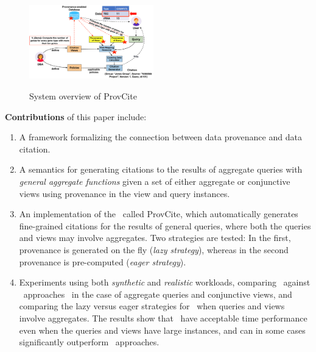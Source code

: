 \begin{figure}[t!]
    \centering
    \includegraphics[width=0.48\textwidth,height=0.25\textwidth]{Figures/general_citaiton_framework.pdf}
    \caption{System overview of ProvCite}
    \small \label{fig:DataCitationFW}
\end{figure}

{\textbf{Contributions}} of this paper include:

\begin{enumerate}
\item A framework formalizing the connection between data provenance and data citation.
\item %
A semantics for generating citations to the results of aggregate queries with {\em general aggregate functions} given a set of either aggregate or conjunctive views using provenance in the view and query instances.
\item An implementation of the \pba\ called ProvCite, which  automatically generates fine-grained citations for the results of general queries, where both the queries and views may involve aggregates. Two strategies are tested: In the first, provenance is generated on the fly ({\em lazy strategy}), whereas in the second provenance is pre-computed ({\em eager strategy}).
\item 
Experiments using both {\em synthetic}  and {\em realistic} workloads, comparing 
\provalg\ against \rba\ approaches~\cite{wu2018data} in the case of aggregate queries and conjunctive views, and comparing the lazy versus eager strategies for \provalg\ when queries and views involve aggregates.  
The results show that \provalg\ have acceptable time performance even when the queries and views have large instances, and can in some cases significantly outperform \rba\ approaches.
\end{enumerate}

